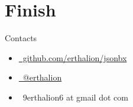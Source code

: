 \documentclass[14pt, compress]{beamer}
\def\twitter{{\FA \faTwitter}}
\def\github{{\FA \faGithubSign}}
\def\email{{\FA \faEnvelope}}
\begin{document}
\section{Finish}

\begin{frame}{Contacts}
    \begin{itemize}[label={}]
        \item \href{https://github.com/erthalion/jsonbx}{\github\ github.com/erthalion/jsonbx}
        \item \href{http://twitter.com/erthalion}{\twitter\ @erthalion}
        \item \email\ 9erthalion6 at gmail dot com
    \end{itemize}
\end{frame}

\end{document}
